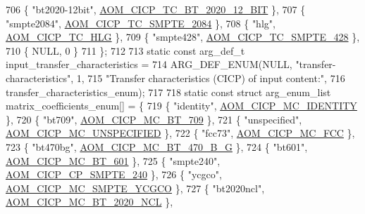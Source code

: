 \begin{DoxyCodeInclude}
{{{{{{{706   \{ \textcolor{stringliteral}{"bt2020-12bit"}, \hyperlink{aom__image_8h_a30655997e3fb79889ee23eb294cb1992afcc74c6858aefc13c426dd6992198e75}{AOM\_CICP\_TC\_BT\_2020\_12\_BIT} \},
707   \{ \textcolor{stringliteral}{"smpte2084"}, \hyperlink{aom__image_8h_a30655997e3fb79889ee23eb294cb1992ab48fdcc8c2c0350f6423b9c116c1876d}{AOM\_CICP\_TC\_SMPTE\_2084} \},
708   \{ \textcolor{stringliteral}{"hlg"}, \hyperlink{aom__image_8h_a30655997e3fb79889ee23eb294cb1992a3d7b83c425c539d1a36fb36e9aebf268}{AOM\_CICP\_TC\_HLG} \},
709   \{ \textcolor{stringliteral}{"smpte428"}, \hyperlink{aom__image_8h_a30655997e3fb79889ee23eb294cb1992a45df590313483af0c614708f346028c4}{AOM\_CICP\_TC\_SMPTE\_428} \},
710   \{ NULL, 0 \}
711 \};
712 
713 \textcolor{keyword}{static} \textcolor{keyword}{const} arg\_def\_t input\_transfer\_characteristics =
714     ARG\_DEF\_ENUM(NULL, \textcolor{stringliteral}{"transfer-characteristics"}, 1,
715                  \textcolor{stringliteral}{"Transfer characteristics (CICP) of input content:"},
716                  transfer\_characteristics\_enum);
717 
718 \textcolor{keyword}{static} \textcolor{keyword}{const} \textcolor{keyword}{struct }arg\_enum\_list matrix\_coefficients\_enum[] = \{
719   \{ \textcolor{stringliteral}{"identity"}, \hyperlink{aom__image_8h_a6bc018ed9689367acae810bc58527081a17489bf0aed544427f7c6bbe4837b212}{AOM\_CICP\_MC\_IDENTITY} \},
720   \{ \textcolor{stringliteral}{"bt709"}, \hyperlink{aom__image_8h_a6bc018ed9689367acae810bc58527081aa70fd9b88bc91bd0d126aaa07421c49a}{AOM\_CICP\_MC\_BT\_709} \},
721   \{ \textcolor{stringliteral}{"unspecified"}, \hyperlink{aom__image_8h_a6bc018ed9689367acae810bc58527081a06a4defb1e5d9bb1d2aad092b8656a03}{AOM\_CICP\_MC\_UNSPECIFIED} \},
722   \{ \textcolor{stringliteral}{"fcc73"}, \hyperlink{aom__image_8h_a6bc018ed9689367acae810bc58527081ae368663c2c2f34683b513e159c5738b9}{AOM\_CICP\_MC\_FCC} \},
723   \{ \textcolor{stringliteral}{"bt470bg"}, \hyperlink{aom__image_8h_a6bc018ed9689367acae810bc58527081ae9107262b437659514abdcd928e977db}{AOM\_CICP\_MC\_BT\_470\_B\_G} \},
724   \{ \textcolor{stringliteral}{"bt601"}, \hyperlink{aom__image_8h_a6bc018ed9689367acae810bc58527081a0f81310501079cc1184d5265ae2c18a5}{AOM\_CICP\_MC\_BT\_601} \},
725   \{ \textcolor{stringliteral}{"smpte240"}, \hyperlink{aom__image_8h_a5267ad095a088ece3499336812503cefa1a8b2e5694489121f80a406d9da25dfb}{AOM\_CICP\_CP\_SMPTE\_240} \},
726   \{ \textcolor{stringliteral}{"ycgco"}, \hyperlink{aom__image_8h_a6bc018ed9689367acae810bc58527081aa2140164b26b42404c376cc921ce27c5}{AOM\_CICP\_MC\_SMPTE\_YCGCO} \},
727   \{ \textcolor{stringliteral}{"bt2020ncl"}, \hyperlink{aom__image_8h_a6bc018ed9689367acae810bc58527081adf60aa79c6a68f4eb41e1095f8bf7bf6}{AOM\_CICP\_MC\_BT\_2020\_NCL} \},
}}}}}}}
\end{DoxyCodeInclude}
